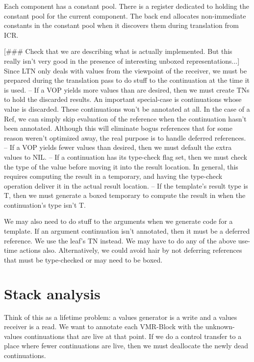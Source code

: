 Each component has a constant pool.  There is a register dedicated to holding
the constant pool for the current component.  The back end allocates
non-immediate constants in the constant pool when it discovers them during
translation from ICR.

[\#\#\# Check that we are describing what is actually implemented.  But this
really isn't very good in the presence of interesting unboxed
representations...] 
Since LTN only deals with values from the viewpoint of the receiver, we must be
prepared during the translation pass to do stuff to the continuation at the
time it is used.
 -- If a VOP yields more values than are desired, then we must create TNs to
    hold the discarded results.  An important special-case is continuations
    whose value is discarded.  These continuations won't be annotated at all.
    In the case of a Ref, we can simply skip evaluation of the reference when
    the continuation hasn't been annotated.  Although this will eliminate
    bogus references that for some reason weren't optimized away, the real
    purpose is to handle deferred references.
 -- If a VOP yields fewer values than desired, then we must default the extra
    values to NIL.
 -- If a continuation has its type-check flag set, then we must check the type
    of the value before moving it into the result location.  In general, this
    requires computing the result in a temporary, and having the type-check
    operation deliver it in the actual result location.
 -- If the template's result type is T, then we must generate a boxed
    temporary to compute the result in when the continuation's type isn't T.


We may also need to do stuff to the arguments when we generate code for a
template.  If an argument continuation isn't annotated, then it must be a
deferred reference.  We use the leaf's TN instead.  We may have to do any of
the above use-time actions also.  Alternatively, we could avoid hair by not
deferring references that must be type-checked or may need to be boxed.


\section{Stack analysis}

Think of this as a lifetime problem: a values generator is a write and a values
receiver is a read.  We want to annotate each VMR-Block with the unknown-values
continuations that are live at that point.  If we do a control transfer to a
place where fewer continuations are live, then we must deallocate the newly
dead continuations.

